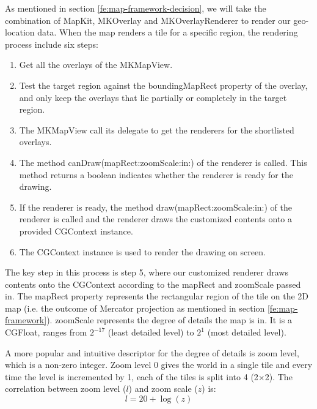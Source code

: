 \documentclass[12pt,a4paper]{article}
\renewcommand\texttt[1]{{\ttfamily\color{textttColor}#1}}
\begin{document}
            As mentioned in section \ref{fe:map-framework-decision}, we will take the combination of \texttt{MapKit}, \texttt{MKOverlay} and \texttt{MKOverlayRenderer} to render our geo-location data. When the map renders a tile for a specific region, the rendering process include six steps:
            
            \begin{enumerate}
                \item Get all the overlays of the \texttt{MKMapView}.
                \item Test the target region against the \texttt{boundingMapRect} property of the overlay, and only keep the overlays that lie partially or completely in the target region.
                \item The \texttt{MKMapView} call its delegate to get the renderers for the shortlisted overlays.
                \item The method \texttt{canDraw(mapRect:zoomScale:in:)} of the renderer is called. This method returns a boolean indicates whether the renderer is ready for the drawing.
                \item If the renderer is ready, the method \texttt{draw(mapRect:zoomScale:in:)} of the renderer is called and the renderer draws the customized contents onto a provided \texttt{CGContext} instance.
                \item The \texttt{CGContext} instance is used to render the drawing on screen.
            \end{enumerate}
            
            The key step in this process is step 5, where our customized renderer draws contents onto the \texttt{CGContext} according to the \texttt{mapRect} and \texttt{zoomScale} passed in. The \texttt{mapRect} property represents the rectangular region of the tile on the 2D map (i.e. the outcome of Mercator projection as mentioned in section \ref{fe:map-framework}). \texttt{zoomScale} represents the degree of details the map is in. It is a \texttt{CGFloat}, ranges from $2^{-17}$ (least detailed level) to $2^{1}$ (most detailed level). 
            
            A more popular and intuitive descriptor for the degree of details is zoom level, which is a non-zero integer. Zoom level 0 gives the world in a single tile and every time the level is incremented by 1, each of the tiles is split into 4 (2$\times$2). The correlation between zoom level ($l$) and zoom scale ($z$) is:
            \begin{equation*}
                l = 20 + \log(z)
            \end{equation*}
            
\end{document}
